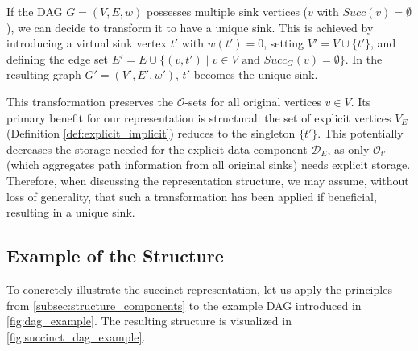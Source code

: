 \begin{remark}
    If the DAG $G=(V, E, w)$ possesses multiple sink vertices ($v$ with $Succ(v) = \emptyset$), we can decide to transform it to have a unique sink. This is achieved by introducing a virtual sink vertex $t'$ with $w(t') = 0$, setting $V' = V \cup \{t'\}$, and defining the edge set $E' = E \cup \{ (v, t') \mid v \in V \text{ and } Succ_G(v) = \emptyset \}$. In the resulting graph $G'=(V', E', w')$, $t'$ becomes the unique sink.

    This transformation preserves the $\mathcal{O}$-sets for all original vertices $v \in V$. Its primary benefit for our representation is structural: the set of explicit vertices $V_E$ (Definition \ref{def:explicit_implicit}) reduces to the singleton $\{t'\}$. This potentially decreases the storage needed for the explicit data component $\mathcal{D}_E$, as only $\mathcal{O}_{t'}$ (which aggregates path information from all original sinks) needs explicit storage. Therefore, when discussing the representation structure, we may assume, without loss of generality, that such a transformation has been applied if beneficial, resulting in a unique sink.
\end{remark}


\subsection*{Example of the Structure}
\label{subsec:structure_example}

To concretely illustrate the succinct representation, let us apply the principles from \autoref{subsec:structure_components} to the example DAG introduced in \autoref{fig:dag_example}. The resulting structure is visualized in \autoref{fig:succinct_dag_example}.

